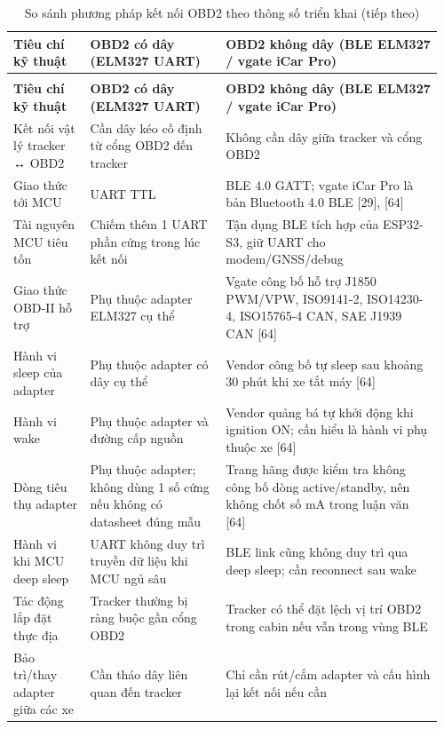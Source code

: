 \documentclass[a4paper]{extarticle}
\newcommand{\thesissettableid}[2]{%
  \renewcommand{\thetable}{#1}%
  \renewcommand{\theHtable}{#2}%
}
\begin{document}
{\thesissettableid{3.5}{tab-ch3-so-sanh-phuong-phap-ket-noi-obd2-theo-thong-so-trien-khai}
\def\LTcaptype{table}
\begin{longtable}{|L{0.177\linewidth}|L{0.303\linewidth}|L{0.484\linewidth}|}
\caption{So sánh phương pháp kết nối OBD2 theo thông số triển khai}\label{tab:ch3-so-sanh-phuong-phap-ket-noi-obd2-theo-thong-so-trien-khai}\\
\hline \textbf{Tiêu chí kỹ thuật} & \textbf{OBD2 có dây (ELM327 UART)} & \textbf{OBD2 không dây (BLE
ELM327 / vgate iCar Pro)} \\
\hline
\endfirsthead
\caption[]{So sánh phương pháp kết nối OBD2 theo thông số triển khai (tiếp theo)}\\
\hline \textbf{Tiêu chí kỹ thuật} & \textbf{OBD2 có dây (ELM327 UART)} & \textbf{OBD2 không dây (BLE
ELM327 / vgate iCar Pro)} \\
\hline
\endhead
\hline
\endfoot
\endlastfoot
Kết nối vật lý tracker ↔ OBD2 & Cần dây kéo cố định từ cổng OBD2 đến
tracker & Không cần dây giữa tracker và cổng OBD2 \\\hline
Giao thức tới MCU & UART TTL & BLE 4.0 GATT; vgate iCar Pro là bản
Bluetooth 4.0 BLE {[}29{]}, {[}64{]} \\\hline
Tài nguyên MCU tiêu tốn & Chiếm thêm 1 UART phần cứng trong lúc kết nối
& Tận dụng BLE tích hợp của ESP32-S3, giữ UART cho modem/GNSS/debug \\\hline
Giao thức OBD-II hỗ trợ & Phụ thuộc adapter ELM327 cụ thể & Vgate công
bố hỗ trợ J1850 PWM/VPW, ISO9141-2, ISO14230-4, ISO15765-4 CAN, SAE
J1939 CAN {[}64{]} \\\hline
Hành vi sleep của adapter & Phụ thuộc adapter có dây cụ thể & Vendor
công bố tự sleep sau khoảng 30 phút khi xe tắt máy {[}64{]} \\\hline
Hành vi wake & Phụ thuộc adapter và đường cấp nguồn & Vendor quảng bá tự
khởi động khi ignition ON; cần hiểu là hành vi phụ thuộc xe {[}64{]} \\\hline
Dòng tiêu thụ adapter & Phụ thuộc adapter; không dùng 1 số cứng nếu
không có datasheet đúng mẫu & Trang hãng được kiểm tra không công bố
dòng active/standby, nên không chốt số mA trong luận văn {[}64{]} \\\hline
Hành vi khi MCU deep sleep & UART không duy trì truyền dữ liệu khi MCU
ngủ sâu & BLE link cũng không duy trì qua deep sleep; cần reconnect sau
wake \\\hline
Tác động lắp đặt thực địa & Tracker thường bị ràng buộc gần cổng OBD2 &
Tracker có thể đặt lệch vị trí OBD2 trong cabin nếu vẫn trong vùng
BLE \\\hline
Bảo trì/thay adapter giữa các xe & Cần tháo dây liên quan đến tracker &
Chỉ cần rút/cắm adapter và cấu hình lại kết nối nếu cần \\\hline
\end{longtable}
}
\end{document}
